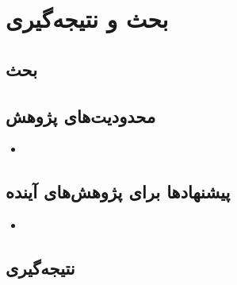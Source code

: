 
\chapter{بحث و نتیجه‌گیری}
\section{بحث}

\section{محدودیت‌های پژوهش}
\begin{itemize}
  \item
\end{itemize}

\section{پیشنهادها برای پژوهش‌های آینده}
\begin{itemize}
  \item
\end{itemize}

\section{نتیجه‌گیری}
